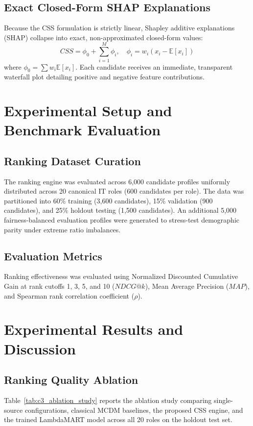 \documentclass[conference]{IEEEtran}
\begin{document}
\subsection{Exact Closed-Form SHAP Explanations}
Because the CSS formulation is strictly linear, Shapley additive explanations (SHAP) collapse into exact, non-approximated closed-form values:
\begin{equation}
CSS = \phi_0 + \sum_{i=1}^M \phi_i, \quad \phi_i = w_i \left(x_i - \mathbb{E}[x_i]\right)
\end{equation}
where $\phi_0 = \sum w_i \mathbb{E}[x_i]$. Each candidate receives an immediate, transparent waterfall plot detailing positive and negative feature contributions.

\section{Experimental Setup and Benchmark Evaluation}

\subsection{Ranking Dataset Curation}
The ranking engine was evaluated across 6,000 candidate profiles uniformly distributed across 20 canonical IT roles (600 candidates per role). The data was partitioned into 60\% training (3,600 candidates), 15\% validation (900 candidates), and 25\% holdout testing (1,500 candidates). An additional 5,000 fairness-balanced evaluation profiles were generated to stress-test demographic parity under extreme ratio imbalances.

\subsection{Evaluation Metrics}
Ranking effectiveness was evaluated using Normalized Discounted Cumulative Gain at rank cutoffs 1, 3, 5, and 10 ($NDCG@k$), Mean Average Precision ($MAP$), and Spearman rank correlation coefficient ($\rho$).

\section{Experimental Results and Discussion}

\subsection{Ranking Quality Ablation}
Table~\ref{tab:c3_ablation_study} reports the ablation study comparing single-source configurations, classical MCDM baselines, the proposed CSS engine, and the trained LambdaMART model across all 20 roles on the holdout test set.
\end{document}
